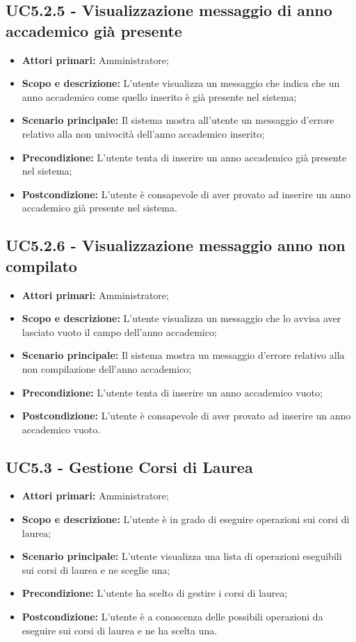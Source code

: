 \documentclass[AnalisiDeiRequisiti.tex]{subfiles}
\begin{document}
\subsection{UC5.2.5 - Visualizzazione messaggio di anno accademico già presente}
\begin{itemize}
	\item \textbf{Attori primari:} Amministratore;
	\item \textbf{Scopo e descrizione:} L'utente visualizza un messaggio che indica che un anno accademico come quello inserito è già presente nel sistema;
	\item \textbf{Scenario principale:} Il sistema mostra all'utente un messaggio d'errore relativo alla non univocità dell'anno accademico inserito;
	\item \textbf{Precondizione:} L'utente tenta di inserire un anno accademico già presente nel sistema; 
	\item \textbf{Postcondizione:} L'utente è consapevole di aver provato ad inserire un anno accademico già presente nel sistema.
\end{itemize}
\subsection{UC5.2.6 - Visualizzazione messaggio anno non compilato}
\begin{itemize}
	\item \textbf{Attori primari:} Amministratore;
	\item \textbf{Scopo e descrizione:} L'utente visualizza un messaggio che lo avvisa aver lasciato vuoto il campo dell'anno accademico;
	\item \textbf{Scenario principale:} Il sistema mostra un messaggio d'errore relativo alla non compilazione dell'anno accademico;
	\item \textbf{Precondizione:} L'utente tenta di inserire un anno accademico vuoto; 
	\item \textbf{Postcondizione:} L'utente è consapevole di aver provato ad inserire un anno accademico vuoto.
\end{itemize}
\subsection{UC5.3 - Gestione Corsi di Laurea}
\begin{itemize}
	\item \textbf{Attori primari:} Amministratore;
	\item \textbf{Scopo e descrizione:} L'utente è in grado di eseguire operazioni sui corsi di laurea;
	\item \textbf{Scenario principale:} L'utente visualizza una lista di operazioni eseguibili sui corsi di laurea e ne sceglie una;
	\item \textbf{Precondizione:} L'utente ha scelto di gestire i corsi di laurea; 
	\item \textbf{Postcondizione:} L'utente è a conoscenza delle possibili operazioni da eseguire sui corsi di laurea e ne ha scelta una.
\end{itemize}
\end{document}
